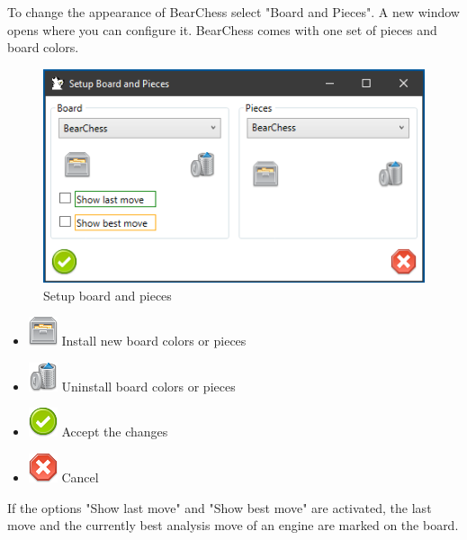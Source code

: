 \documentclass[11pt,a4paper]{article}
\begin{document}
To change the appearance of BearChess select "Board and Pieces". A new window opens where you can configure it. BearChess comes with one set of pieces and board colors.

\begin{figure}[H]
	\centering
	\includegraphics[scale=0.9]{SettingsBoardAndPieces2.png}
	\caption{Setup board and pieces }
	\label{fig:SettingsBoardAndPieces2}
\end{figure}


\begin{itemize}
	\item \includegraphics[scale=0.5]{file_manager.png} Install new board colors or pieces
	\item \includegraphics[scale=0.5]{bin.png} Uninstall board colors or pieces
	\item \includegraphics[scale=0.5]{accept_button.png} Accept the changes
	\item \includegraphics[scale=0.5]{cancel.png} Cancel
\end{itemize}

If the options "Show last move" and "Show best move" are activated, the last move and the currently best analysis move of an engine are marked on the board.
\end{document}
